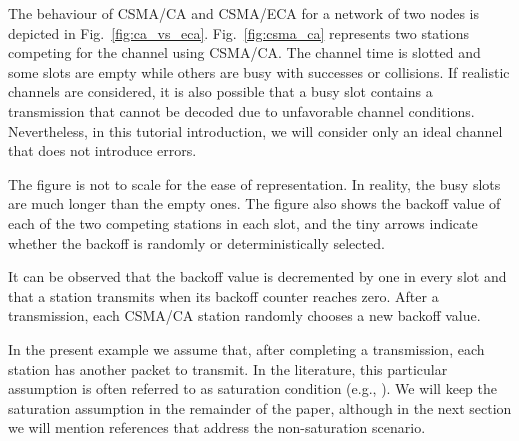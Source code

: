 \documentclass[journal]{IEEEtran}
\begin{document}
The behaviour of CSMA/CA and CSMA/ECA for a network of two nodes is depicted in Fig.~\ref{fig:ca_vs_eca}.
Fig.~\ref{fig:csma_ca} represents two stations competing for the channel using CSMA/CA.
The channel time is slotted and some slots are empty while others are busy with successes or collisions.
If realistic channels are considered, it is also possible that a busy slot contains a transmission that cannot be decoded due to unfavorable channel conditions.
Nevertheless, in this tutorial introduction, we will consider only an ideal channel that does not introduce errors.

The figure is not to scale for the ease of representation.
In reality, the busy slots are much longer than the empty ones. 
The figure also shows the backoff value of each of the two competing stations in each slot, and the tiny arrows indicate whether the backoff is randomly or deterministically selected.

It can be observed that the backoff value is decremented by one in every slot and that a station transmits when its backoff counter reaches zero.
After a transmission, each CSMA/CA station randomly chooses a new backoff value.

In the present example we assume that, after completing a transmission, each station has another packet to transmit.
In the literature, this particular assumption is often referred to as saturation condition (e.g., \cite{he2009srb,barcelo2010fcc,fang2011dlm,barcelo2011tcf}).
We will keep the saturation assumption in the remainder of the paper, although in the next section we will mention references that address the non-saturation scenario.
\end{document}
